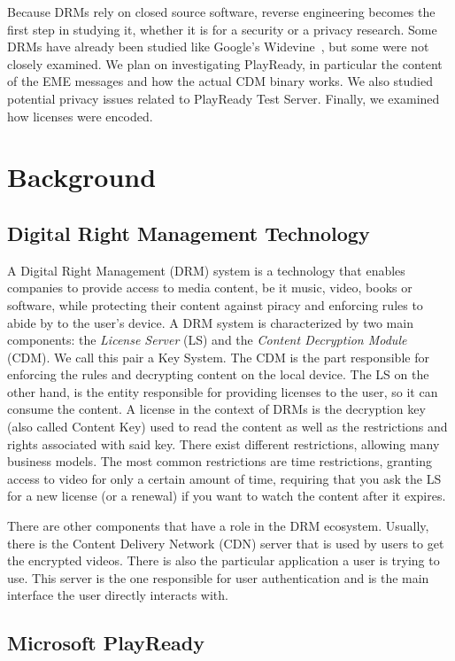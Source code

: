 \documentclass[11pt, a4paper]{IEEEtran}
\begin{document}
Because DRMs rely on closed source software, reverse engineering becomes the first step in studying it, whether it is for a security or a privacy research. Some DRMs have already been studied like Google's Widevine~\cite{widevinefunandprofit,wideleak}, but some were not closely examined. We plan on investigating PlayReady, in particular the content of the EME messages and how the actual CDM binary works. We also studied potential privacy issues related to PlayReady Test Server. Finally, we examined how licenses were encoded. 


\section{Background}

\subsection{Digital Right Management Technology}

A Digital Right Management (DRM) system is a technology that enables companies to provide access to media content, be it music, video, books or software, while protecting their content against piracy and enforcing rules to abide by to the user's device. A DRM system is characterized by two main components: the \emph{License Server} (LS) and the \emph{Content Decryption Module} (CDM). We call this pair a Key System. The CDM is the part responsible for enforcing the rules and decrypting content on the local device. The LS on the other hand, is the entity responsible for providing licenses to the user, so it can consume the content. A license in the context of DRMs is the decryption key (also called Content Key) used to read the content as well as the restrictions and rights associated with said key. There exist different restrictions, allowing many business models. The most common restrictions are time restrictions, granting access to video for only a certain amount of time, requiring that you ask the LS for a new license (or a renewal) if you want to watch the content after it expires.

There are other components that have a role in the DRM ecosystem. Usually, there is the Content Delivery Network (CDN) server that is used by users to get the encrypted videos. There is also the particular application a user is trying to use. This server is the one responsible for user authentication and is the main interface the user directly interacts with. 


\subsection{Microsoft PlayReady}
\end{document}
